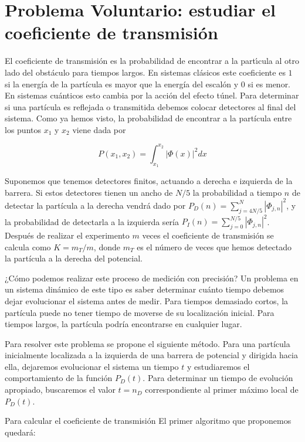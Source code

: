 \documentclass[12pt,spanish]{iopart}
\newcommand{\be}{\begin{equation}}
\newcommand{\ee}{\end{equation}}
\begin{document}
\section{Problema Voluntario: estudiar el coeficiente de transmisi{\'o}n}


El coeficiente de  transmisi{\'o}n es la probabilidad de encontrar a la part{\'\i}cula al otro lado del obst{\'a}culo para tiempos largos. En sistemas cl{\'a}sicos este coeficiente es $1$ si la energ\'ia de la part\'icula es mayor que la energ\'ia del escal\'on y $0$ si es menor. En sistemas cu\'anticos esto cambia por la acci\'on del efecto t\'unel. Para determinar si una part\'icula es reflejada o transmitida debemos colocar detectores al final del sistema. Como ya hemos visto, la probabilidad de encontrar a la part\'icula entre los puntos $x_1$ y $x_2$ viene dada por 

\be
P(x_1,x_2)=\int_{x_1}^{x_2} \left| \Phi(x) \right|^2 dx 
\ee

Suponemos que tenemos detectores finitos, actuando a derecha e izquierda de la barrera. Si estos detectores tienen un ancho de $N/5$ la probabilidad a tiempo $n$ de detectar la part\'icula a la derecha vendr\'a dado por  $P_D(n)=\sum_{j=4N/5}^N \left|  \Phi_{j,n} \right|^2$, y la probabilidad de detectarla a la izquierda ser\'ia $P_I(n)=\sum_{j=0}^{N/5} \left|  \Phi_{j,n} \right|^2$. Despu\'es de realizar el experimento $m$ veces el coeficiente de transmisi\'on se calcula como $K=m_T/m$, donde $m_T$ es el n\'umero de veces que hemos detectado la part\'icula a la derecha del potencial. 

¿Cómo podemos realizar este proceso de medición con precisión? Un problema en un sistema dinámico de este tipo es saber determinar cuánto tiempo debemos dejar evolucionar el sistema antes de medir. Para tiempos demasiado cortos, la partícula puede no tener tiempo de moverse de su localización inicial. Para tiempos largos, la partícula podría encontrarse en cualquier lugar.

Para resolver este problema se propone el siguiente método. Para una partícula inicialmente localizada a la izquierda de una barrera de potencial y dirigida hacia ella, dejaremos evolucionar el sistema un tiempo $t$ y estudiaremos el comportamiento de la función $P_D(t)$. Para determinar un tiempo de evolución apropiado, buscaremos el valor $t=n_D$ correspondiente al primer máximo local de $P_D(t)$.


Para calcular el coeficiente de transmisión El primer algoritmo  que proponemos quedar\'a:
\end{document}
